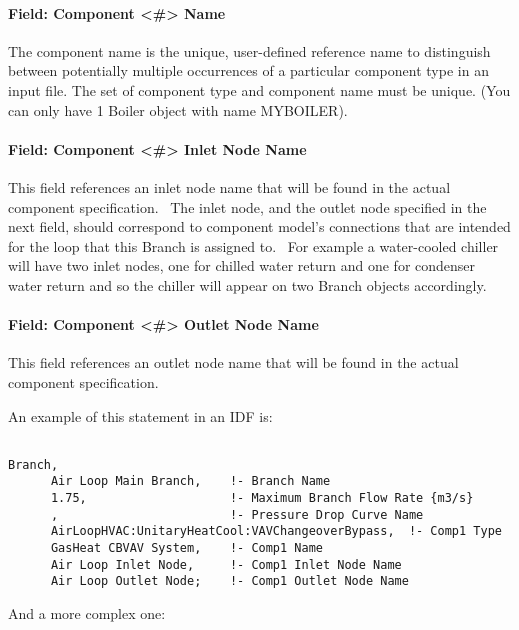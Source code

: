 \paragraph{Field: Component \textless{}\#\textgreater{} Name}\label{field-component-name-001}

The component name is the unique, user-defined reference name to distinguish between potentially multiple occurrences of a particular component type in an input file. The set of component type and component name must be unique. (You can only have 1 Boiler object with name MYBOILER).

\paragraph{Field: Component \textless{}\#\textgreater{} Inlet Node Name}\label{field-component-inlet-node-name}

This field references an inlet node name that will be found in the actual component specification.~ The inlet node, and the outlet node specified in the next field, should correspond to component model's connections that are intended for the loop that this Branch is assigned to.~ For example a water-cooled chiller will have two inlet nodes, one for chilled water return and one for condenser water return and so the chiller will appear on two Branch objects accordingly.

\paragraph{Field: Component \textless{}\#\textgreater{} Outlet Node Name}\label{field-component-outlet-node-name}

This field references an outlet node name that will be found in the actual component specification.

An example of this statement in an IDF is:

\begin{lstlisting}

Branch,
      Air Loop Main Branch,    !- Branch Name
      1.75,                    !- Maximum Branch Flow Rate {m3/s}
      ,                        !- Pressure Drop Curve Name
      AirLoopHVAC:UnitaryHeatCool:VAVChangeoverBypass,  !- Comp1 Type
      GasHeat CBVAV System,    !- Comp1 Name
      Air Loop Inlet Node,     !- Comp1 Inlet Node Name
      Air Loop Outlet Node;    !- Comp1 Outlet Node Name
\end{lstlisting}

And a more complex one:

